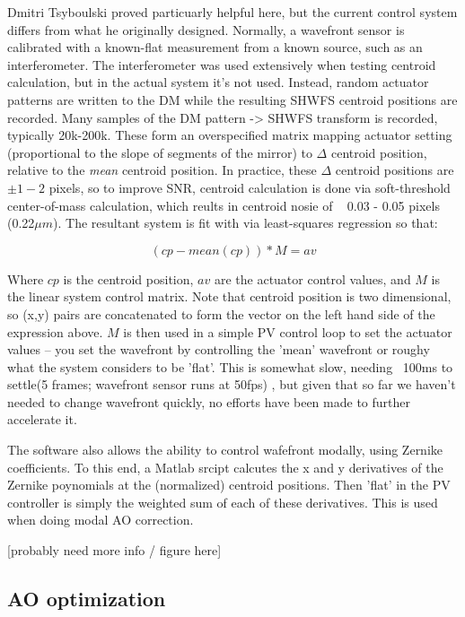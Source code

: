 \documentclass[a4paper,10pt]{article}
\begin{document}
Dmitri Tsyboulski proved particuarly helpful here, but the current control system differs from what he originally designed.  Normally, a wavefront sensor is calibrated with a known-flat measurement from a known source, such as an interferometer.  The interferometer was used extensively when testing centroid calculation, but in the actual system it's not used.  Instead, random actuator patterns are written to the DM while the resulting SHWFS centroid positions are recorded.  Many samples of the DM pattern -> SHWFS transform is recorded, typically 20k-200k.  These form an overspecified matrix mapping actuator setting (proportional to the slope of segments of the mirror) to $\Delta$ centroid position, relative to the \textit{mean} centroid position.  In practice, these $\Delta$ centroid positions are $\pm 1-2$ pixels, so to improve SNR, centroid calculation is done via soft-threshold center-of-mass calculation, which reults in centroid nosie of ~ 0.03 - 0.05 pixels (0.22$\mu m$).  The resultant system is fit with via least-squares regression so that: 

$$ (cp - mean(cp)) * M = av $$

Where $cp$ is the centroid position, $av$ are the actuator control values, and $M$ is the linear system control matrix.  Note that centroid position is two dimensional, so (x,y) pairs are concatenated to form the vector on the left hand side of the expression above. $M$ is then used in a simple PV control loop to set the actuator values -- you set the wavefront by controlling the 'mean' wavefront or roughy what the system considers to be 'flat'.  This is somewhat slow, needing ~100ms to settle(5 frames; wavefront sensor runs at 50fps) , but given that so far we haven't needed to change wavefront quickly, no efforts have been made to further accelerate it.  

The software also allows the ability to control wafefront modally, using Zernike coefficients.   To this end,   a Matlab srcipt calcutes the x and y derivatives of the Zernike poynomials at the (normalized) centroid positions.  Then 'flat' in the PV controller is simply the weighted sum of each of these derivatives.  This is used when doing modal AO correction.  

[probably need more info / figure here] 

\subsection {AO optimization}
\end{document}
